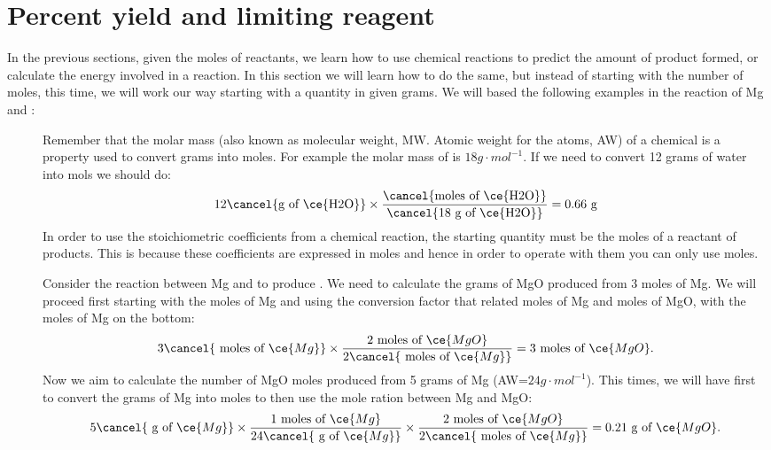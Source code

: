 \documentclass[main.tex]{subfiles}
\begin{document}
\section{Percent yield and limiting reagent}
In the previous sections, given the moles of reactants, we learn how to use chemical reactions to predict the amount of product formed, or calculate the energy involved in a reaction. In this section we will learn how to do the same, but instead of starting with the number of moles, this time, we will work our way starting with a quantity in given grams. We will based the following examples in the reaction of Mg and :
\begin{center}\end{center}
\sloppy 
\begin{description}
\item[] 
Remember that the molar mass (also known as molecular weight, MW. Atomic weight for the atoms, AW) of a chemical is a property used to convert grams into moles. For example the molar mass of  is $18g\cdot mol^{-1}$. If we need to convert 12 grams of water into mols we should do:
 \begin{equation*}
12  \cancel{\text{g of \ce{H2O}}} \times 
\dfrac{\cancel{\text{moles of \ce{H2O}} }} { \cancel{\text{18 g of \ce{H2O}}} } 
=\text{0.66 g}
\end{equation*}
In order to use the stoichiometric coefficients from a chemical reaction, the starting quantity must be the moles of a reactant of products. This is because these coefficients are expressed in moles and hence in order to operate with them you can only use moles. 
\item[] 
Consider the reaction between Mg and  to produce . We need to calculate the grams of MgO produced from 3 moles of Mg. We will proceed first starting with the moles of Mg and using the conversion factor that related moles of Mg and moles of MgO, with the moles of Mg on the bottom:
\begin{equation*}
3\cancel{\text{ moles of }\ce{Mg}} \times \dfrac{\text{2 moles of }\ce{MgO}}{2\cancel{\text{ moles of }\ce{Mg}}}=3\text{ moles of }\ce{MgO}.
\end{equation*}
Now we aim to calculate the number of MgO moles produced from 5 grams of Mg (AW=$24g\cdot mol^{-1}$). This times, we will have first to convert the grams of Mg into moles to then use the mole ration between Mg and MgO:
\begin{equation*}
5\cancel{\text{ g of }\ce{Mg}}   \times  \dfrac{1 \text{ moles of }\ce{Mg}}{24\cancel{\text{ g of }\ce{Mg}}}
 \times \dfrac{\text{2 moles of }\ce{MgO}}{2\cancel{\text{ moles of }\ce{Mg}}}=0.21\text{ g of }\ce{MgO}.
\end{equation*}


\end{description}
\end{document}
